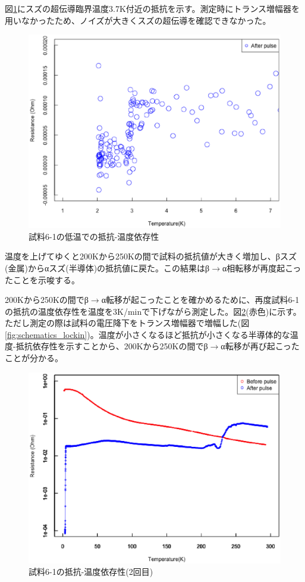 図\ref{fig:181213_after_pulse2}にスズの超伝導臨界温度3.7K付近の抵抗を示す。測定時にトランス増幅器を用いなかったため、ノイズが大きくスズの超伝導を確認できなかった。
\begin{figure}[!h]
    \begin{center}
   \includegraphics[width=0.7\hsize]{results_discussions/181213_after_pulse2.eps}
  \end{center}
  \caption{試料6-1の低温での抵抗-温度依存性}
  \label{fig:181213_after_pulse2}
  \end{figure}

温度を上げてゆくと200Kから250Kの間で試料の抵抗値が大きく増加し、βスズ(金属)からαスズ(半導体)の抵抗値に戻た。この結果はβ$\to$α相転移が再度起こったことを示唆する。

200Kから250Kの間でβ$\to$α転移が起こったことを確かめるために、再度試料6-1の抵抗の温度依存性を温度を3K/minで下げながら測定した。図\ref{fig:181228_before_after_pulse_log}(赤色)に示す。ただし測定の際は試料の電圧降下をトランス増幅器で増幅した(図\ref{fig:schematics_lockin})。温度が小さくなるほど抵抗が小さくなる半導体的な温度-抵抗依存性を示すことから、200Kから250Kの間でβ$\to$α転移が再び起こったことが分かる。
\begin{figure}[!h]
    \begin{center}
   \includegraphics[width=0.8\hsize]{results_discussions/181228_before_after_pulse_log.eps}
  \end{center}
  \caption{試料6-1の抵抗-温度依存性(2回目)}
  \label{fig:181228_before_after_pulse_log}
\end{figure}

